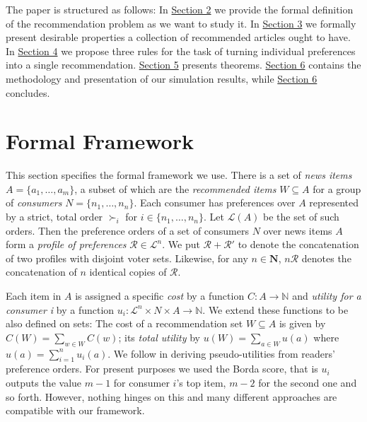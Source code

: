 \documentclass{article}
\begin{document}
The paper is structured as follows: In \hyperlink{framework}{Section 2} we provide the formal definition of the recommendation problem as we want to study it.
In \hyperlink{axioms}{Section 3} we formally present desirable properties a collection of recommended articles ought to have.
In \hyperlink{rules}{Section  4} we propose three rules for the task of turning individual preferences into a single recommendation. \hyperlink{proofs}{Section 5} presents theorems.
\hyperlink{simulations}{Section 6} contains the methodology and presentation of our simulation results, while
\hyperlink{conclusion}{Section 6} concludes.





\hypertarget{framework}{\section{Formal Framework}}


This section specifies the formal framework we use.
There is a set of \emph {news items} $A=\{a_1,\dotsc,a_m\}$, a subset of which are the \emph {recommended items} $W\subseteq A$ for a group of \emph {consumers} $N=\{n_1,\dotsc,n_n\}$. Each consumer has preferences over $A$ represented by a strict, total order $\succ_i$ for $i\in \{ n_1, \dotsc, n_n\}$. Let $\mathcal{L}(A)$ be the set of such orders. Then the preference orders of a set of consumers $N$ over news items $A$ form a \emph {profile of preferences} $\mathcal{R}\in \mathcal{L}^n$. We put $\mathcal{R}+\mathcal{R'}$ to denote the concatenation of two profiles with disjoint voter sets. Likewise, for any $n\in \mathbf{N}$, $n\mathcal{R}$ denotes the concatenation of $n$ identical copies of $\mathcal{R}$.

Each item in $A$ is assigned a specific \emph{cost} by a function
 $C: A \rightarrow {\mathbb N}$ and \emph{utility for a consumer i} by a function $u_i:\mathcal{L}^n \times N \times  A \rightarrow \mathbb{N}$. We extend these functions to be also defined on sets: The cost of a recommendation set $W\subseteq A$ is given by $C(W)=\sum_{w\in W}C(w)$; its \emph {total utility} by $u(W)=\sum_{a\in W} u(a)$ where $u(a)=\sum_{i=1}^n u_i(a)$.
We follow  in deriving pseudo-utilities from readers' preference orders. For present purposes we used the Borda score, that is $u_i$ outputs the value $m-1$ for consumer $i$'s top item, $m-2$ for the second one and so forth. However, nothing hinges on this and many different approaches are compatible with our framework.
\end{document}
